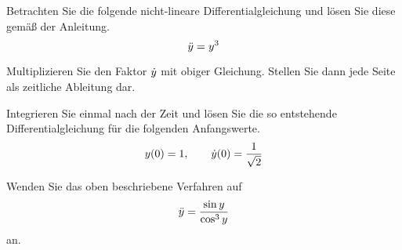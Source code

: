 \begin{atiTask}[
title = Die Methode des Energiesatzes
]
  \begin{atiSubtasks}
    \item{
      Betrachten Sie die folgende nicht-lineare Differentialgleichung und lösen Sie diese gemäß der Anleitung.
      \[
        \ddot{y} = y^3
      \]
      \begin{atiItems}
        \item{
          Multiplizieren Sie den Faktor $\dot{y}$ mit obiger Gleichung.
          Stellen Sie dann jede Seite als zeitliche Ableitung dar.
        }
        \item{
          Integrieren Sie einmal nach der Zeit und lösen Sie die so entstehende Differentialgleichung für die folgenden Anfangswerte.
          \[
            y(0) = 1
            ,\qquad
            \dot{y}(0) = \frac{1}{\sqrt{2}}
          \]
        }
      \end{atiItems}
    }
    \item{
      Wenden Sie das oben beschriebene Verfahren auf
      \[
        \ddot{y} = \frac{\sin y}{\cos^3 y}
      \]
      an.
    }
  \end{atiSubtasks}
\end{atiTask}